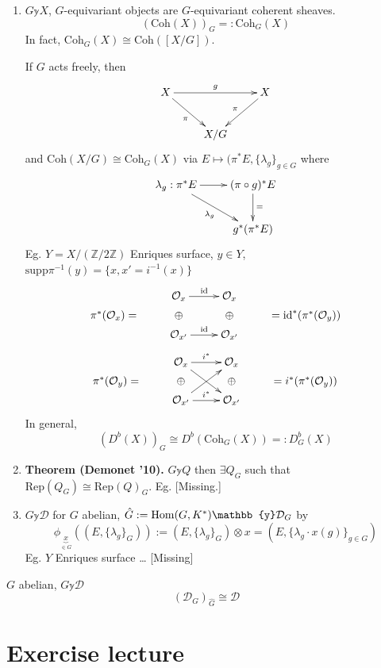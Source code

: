 \begin{example}
\label{example-G-equivariant-objects}
\begin{enumerate}
\item $G\mathbb{y}X$, $G$-equivariant objects
are $G$-equivariant coherent
sheaves.
$$
(\text{Coh}(X))_G=:\text{Coh}_G(X)
$$
In fact, $\text{Coh}_G(X)\cong
\text{Coh}([X/G])$.

If $G$ acts freely, then
$$
\xymatrix{
X\ar[dr]_{\pi}\ar[rr]^g &  &
X\ar[dl]_{\pi}\\
&X/G
}
$$
and $\text{Coh}(X/G)\cong \text{Coh}_G(X)$
via $E \mapsto (\pi^* E,\{\lambda_g\}_{g \in
G}$ where
$$
\xymatrix{
\lambda_g:\pi^* E\ar[dr]_{\lambda_g}\ar[r]&
(\pi \circ g)^* E\ar[d]^=\\
&g^*(\pi^*E)
}
$$
Eg. $Y=X/(\mathbb{Z}/2\mathbb{Z})$ Enriques
surface, $y \in Y$,
$\text{supp}\pi^{-1}(y)=\{x,x'=i^{-1}(x)\}$
$$
\xymatrix@R=.2em{
&\mathcal{O}_x\ar[r]^{\text{id}}&\mathcal{O}
_x\\
\pi^*
(\mathcal{O}_x)=&\oplus&\oplus&=\text{id}
^*(\pi^*(\mathcal{O}_y))\\
&\mathcal{O}_{x'}\ar[r]^{\text{id}}&
\mathcal{O}_{x'}
}
$$
$$
\xymatrix@R=.2em{
&\mathcal{O}_x\ar[r]^{i^*}\ar[ddr]&
\mathcal{O}
_x\\
\pi^*
(\mathcal{O}_y)=&\oplus&\oplus&
=i^*(\pi^*(\mathcal{O}_y))\\
&\mathcal{O}_{x'}\ar[r]^{i^*}\ar[uur]&
\mathcal{O}_{x'}
}
$$
In general,
$$
(D^b(X))_G\cong
D^b(\text{Coh}_G(X))=:D^b_G(X)
$$
\item {\bf Theorem (Demonet '10).}
$G\mathbb{y} Q$ then $\exists Q_G$ such that
$\text{Rep}(Q_G)\cong\text{Rep}(Q)_G$. Eg.
[Missing.]

\item $G \mathbb{y} \mathcal{D}$ for $G$
abelian,
$\hat{G}:=\Hom(G,K^*)\mathbb{y}\mathcal{D}_G$
by
$$
\phi_{\underbrace{x}_{\in
G}}((E,\{\lambda_g\}_G))
:=(E,\{\lambda_g\}_G)\otimes
x=(E,\{\lambda_g\cdot x(g)\}_{g \in G})
$$
Eg. $Y$ Enriques surface \ldots{} [Missing]
\end{enumerate}
\end{example}

\begin{theorem}[Elagin '15]
\label{theorem-Elagin}
$G$ abelian, $G\mathbb{y}\mathcal{D}$
$$
(\mathcal{D}_G)_{\hat{G}}\cong \mathcal{D}
$$
\end{theorem}

\section{Exercise lecture}
\label{section-exercise-lecture}

